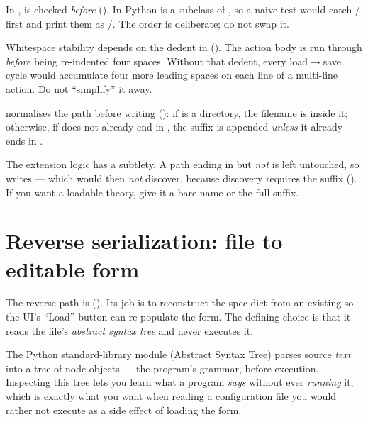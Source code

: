 \begin{gotcha}
In ,  is checked \emph{before} 
(). In Python  is a subclass of , so a naive
 test would catch / first and
print them as /. The order is deliberate; do not swap it.
\end{gotcha}

\begin{gotcha}
Whitespace stability depends on the dedent in 
(). The action body is run through 
\emph{before} being re-indented four spaces. Without that dedent, every
load$\to$save cycle would accumulate four more leading spaces on each line of a
multi-line action. Do not ``simplify'' it away.
\end{gotcha}

 normalises the path before writing
(): if  is a directory, the filename is
 inside it; otherwise, if  does not
already end in , the suffix is appended \emph{unless} it already
ends in .

\begin{gotcha}
The extension logic has a subtlety. A path ending in  but \emph{not}
 is left untouched, so 
writes  --- which  would then \emph{not}
discover, because discovery requires the  suffix
(). If you want a loadable theory, give it a
bare name or the full  suffix.
\end{gotcha}

\section{Reverse serialization: file to editable form}\label{sec:tf-reverse}

The reverse path is 
(). Its job is to reconstruct the spec
dict from an existing  so the UI's ``Load'' button can
re-populate the form. The defining choice is that it reads the file's
\emph{abstract syntax tree} and never executes it.

\begin{defn}
The Python standard-library module  (Abstract Syntax Tree)
parses source \emph{text} into a tree of node objects --- the program's grammar,
before execution. Inspecting this tree lets you learn what a program \emph{says}
without ever \emph{running} it, which is exactly what you want when reading a
configuration file you would rather not execute as a side effect of loading the
form.
\end{defn}

